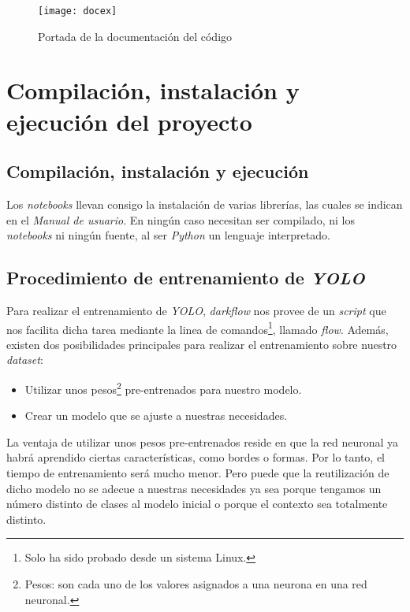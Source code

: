 \begin{figure}
\centering
\texttt{[image: docex]}
\caption{Portada de la documentación del código}
\label{fig:D.3}
\end{figure}

\section{Compilación, instalación y ejecución del proyecto}

\subsection{Compilación, instalación y ejecución}

Los \textit{notebooks} llevan consigo la instalación de varias librerías, las cuales se indican en el \textit{Manual de usuario}. En ningún caso necesitan ser compilado, ni los \textit{notebooks} ni ningún fuente, al ser \textit{Python} un lenguaje interpretado.  

\subsection{Procedimiento de entrenamiento de \textit{YOLO}}

Para realizar el entrenamiento de \textit{YOLO}, \textit{darkflow} nos provee de un \textit{script} que nos facilita dicha tarea mediante la linea de comandos\footnote{Solo ha sido probado desde un sistema Linux.}, llamado \textit{flow}. Además, existen dos posibilidades principales para realizar el entrenamiento sobre nuestro \textit{dataset}:

\begin{itemize}
	\item Utilizar unos pesos\footnote{Pesos: son cada uno de los valores asignados a una neurona en una red neuronal.} pre-entrenados para nuestro modelo.
	\item Crear un modelo que se ajuste a nuestras necesidades.
\end{itemize}

La ventaja de utilizar unos pesos pre-entrenados reside en que la red neuronal ya habrá aprendido ciertas características, como bordes o formas. Por lo tanto, el tiempo de entrenamiento será mucho menor. Pero puede que la reutilización de dicho modelo no se adecue a nuestras necesidades ya sea porque tengamos un número distinto de clases al modelo inicial o porque el contexto sea totalmente distinto.

